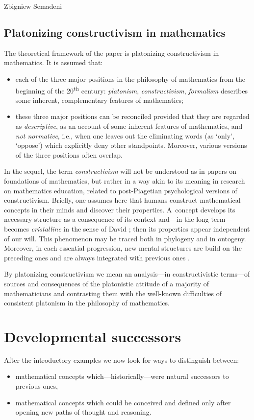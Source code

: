 \begin{artengenv}{Zbigniew Semadeni}
\subsection{Platonizing constructivism in mathematics}
The theoretical framework of the paper is platonizing constructivism in mathematics. 
It is assumed that: 
\begin{itemize} 
\item each of the three major positions in the philosophy of mathematics from the beginning of 
the 20\textsuperscript{th} century: \textit{platonism}, \textit{constructivism}, \textit{formalism} 
describes some inherent, complementary features of mathematics; 
\item these three major positions can be reconciled provided that they are regarded as \textit{descriptive}, 
as an account of some inherent features of mathematics, and \textit{not normative}, 
i.e., when one leaves out the eliminating words (as `only', `oppose') which explicitly deny 
other standpoints. Moreover, various versions of the three positions often overlap. 
\end{itemize}

\noindent In the sequel, the term \textit{constructivism} will not be understood as in papers on 
foundations of mathematics, but rather in a way akin to its meaning in research on mathematics 
education, related to post-Piagetian psychological versions of constructivism. 
Briefly, one assumes here that humans construct mathematical concepts in their minds  
and discover their properties. A~concept develops its necessary structure 
as a consequence of its context and---in the long term---becomes 
\textit{cristalline} in the sense of David \citeauthor{Tall} \parencite*[p.27]{Tall}; then its 
properties appear independent of our will. 
This phenomenon may be traced both in phylogeny and in ontogeny. 
Moreover, in each essential progression, new mental structures are build on the 
preceding ones and are always integrated with previous ones \parencite[pp.22--29]{P-G}.  

By platonizing constructivism we mean an analysis---in constructivistic terms---of 
sources and consequences of the platonistic attitude of a majority of 
mathematicians and contrasting them with the well-known difficulties of consistent 
platonism in the philosophy of mathematics. 

\section{Developmental successors}
After the introductory examples we now look for ways to distinguish between: 
\begin{itemize}
\item mathematical concepts which---historically---were natural successors to 
previous ones,  
\item mathematical concepts which could be conceived and defined only 
after opening new paths of thought and reasoning. 
\end{itemize}


\end{artengenv}
